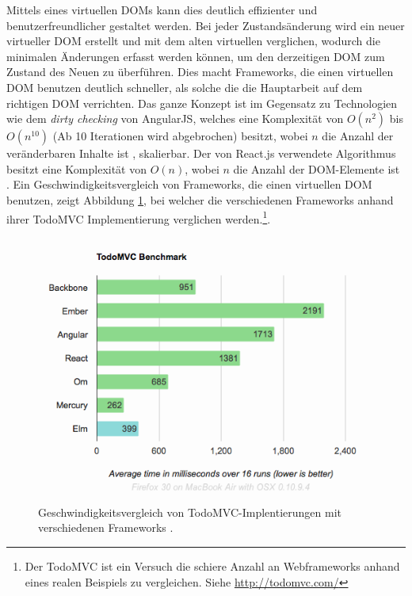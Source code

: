 \documentclass[12pt,twoside]{book}
\begin{document}
Mittels eines virtuellen DOMs kann dies deutlich effizienter und benutzerfreundlicher gestaltet werden. Bei jeder Zustandsänderung wird ein neuer virtueller DOM erstellt und mit dem alten virtuellen verglichen, wodurch die minimalen Änderungen erfasst werden können, um den derzeitigen DOM zum Zustand des Neuen zu überführen. Dies macht Frameworks, die einen virtuellen DOM benutzen deutlich schneller, als solche die die Hauptarbeit auf dem richtigen DOM verrichten. Das ganze Konzept ist im Gegensatz zu Technologien wie dem \textit{dirty checking} von AngularJS, welches eine Komplexität von $O(n^2)$ bis $O(n^{10})$ (Ab 10 Iterationen wird abgebrochen) besitzt, wobei $n$ die Anzahl der veränderbaren Inhalte ist \cite{dirty}, skalierbar.
Der von React.js verwendete Algorithmus besitzt eine Komplexität von $O(n)$, wobei $n$ die Anzahl der DOM-Elemente ist \cite{reactreconciliation}.
Ein Geschwindigkeitsvergleich von Frameworks, die einen virtuellen DOM benutzen, zeigt Abbildung \ref{fig:elm}, bei welcher die verschiedenen Frameworks anhand ihrer TodoMVC Implementierung verglichen werden.\footnote{Der TodoMVC ist ein Versuch die schiere Anzahl an Webframeworks anhand eines realen Beispiels zu vergleichen. Siehe \url{http://todomvc.com/}}.

\begin{figure}[htbp]
    \centering
    \includegraphics[width=1.0\textwidth]{images/virtual_dom.png}
    \caption{Geschwindigkeitsvergleich von TodoMVC-Implentierungen mit verschiedenen Frameworks \cite{elm}.}
    \label{fig:elm}
\end{figure}
\end{document}
